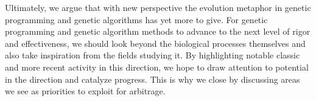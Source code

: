 Ultimately, we argue that with new perspective the evolution metaphor in genetic programming and genetic algorithms has yet more to give.
For genetic programming and genetic algorithm methods to advance to the next level of rigor and effectiveness, we should look beyond the biological processes themselves and also take inspiration from the fields studying it.
By highlighting notable classic and more recent activity in this direction, we hope to draw attention to potential in the direction and catalyze progress.
This is why we close by discussing areas we see as priorities to exploit for arbitrage.

